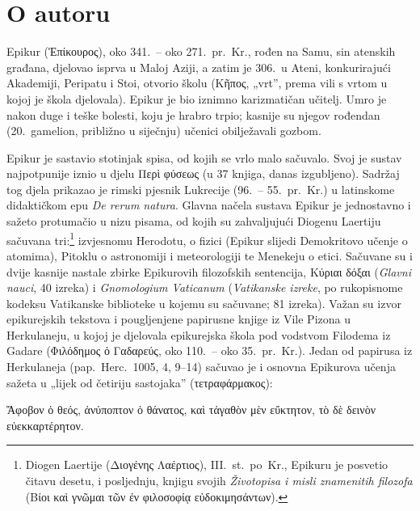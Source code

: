 \section*{O autoru}

Epikur (Ἐπίκουρος), oko 341.\ – oko 271.\ pr.~Kr., rođen na Samu, sin atenskih građana, djelovao isprva u Maloj Aziji, a zatim je 306.\ u Ateni, konkurirajući Akademiji, Peripatu i Stoi, otvorio školu (Κῆπος, „vrt”, prema vili s vrtom u kojoj je škola djelovala). Epikur je bio iznimno karizmatičan učitelj. Umro je nakon duge i teške bolesti, koju je hrabro trpio; kasnije su njegov rođendan (20.\ gamelion, približno u siječnju) učenici obilježavali gozbom.

Epikur je sastavio stotinjak spisa, od kojih se vrlo malo sačuvalo. Svoj je sustav najpotpunije iznio u djelu \textgreek{Περὶ φύσεως} (u 37 knjiga, danas izgubljeno). Sadržaj tog djela prikazao je rimski pjesnik Lukrecije (96.\ – 55.\ pr.~Kr.) u latinskome didaktičkom epu \textit{De rerum natura}. Glavna načela sustava Epikur je jednostavno i sažeto protumačio u nizu pisama, od kojih su zahvaljujući Diogenu Laertiju sačuvana tri:\footnote{Diogen Laertije (Διογένης Λαέρτιος), III.\ st.\ po~Kr., Epikuru je posvetio čitavu desetu, i posljednju, knjigu svojih \textit{Životopisa i misli znamenitih filozofa} (\textgreek{Βίοι καὶ γνῶμαι τῶν ἐν φιλοσοφίᾳ εὐδοκιμησάντων}).} izvjesnomu Herodotu, o fizici (Epikur slijedi Demokritovo učenje o atomima), Pitoklu o astronomiji i meteorologiji te Menekeju o etici. Sačuvane su i dvije kasnije nastale zbirke Epikurovih filozofskih sentencija, Κύριαι δόξαι (\textit{Glavni nauci}, 40 izreka) i \textit{Gnomologium Vaticanum} (\textit{Vatikanske izreke}, po rukopisnome kodeksu Vatikanske biblioteke u kojemu su sačuvane; 81 izreka). Važan su izvor epikurejskih tekstova i pougljenjene papirusne knjige iz Vile Pizona u Herkulaneju, u kojoj je djelovala epikurejska škola pod vodstvom Filodema iz Gadare (\textgreek{Φιλόδημος ὁ Γαδαρεύς}, oko 110.\ – oko 35.\ pr.~Kr.). Jedan od papirusa iz Herkulaneja (pap.\ Herc.\ 1005, 4, 9–14) sačuvao je i osnovna Epikurova učenja sažeta u „lijek od četiriju sastojaka” (τετραφάρμακος): \begin{greek}Ἄφοβον ὁ θεός, ἀνύποπτον ὁ θάνατος, καὶ τἀγαθὸν μὲν εὔκτητον, τὸ δὲ δεινὸν εὐεκκαρτέρητον.\end{greek}%

